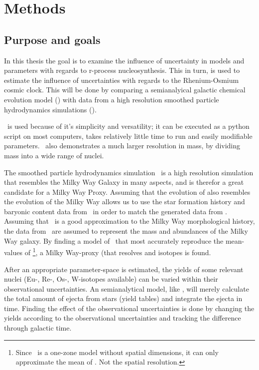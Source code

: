 \chapter{Methods}
\label{sec:methods}
\section{Purpose and goals}
In this thesis the goal is to examine the influence of uncertainty in models and parameters with regards to r-process nucleosynthesis.
This in turn, is used to estimate the influence of uncertainties with regards to the Rhenium-Osmium cosmic clock.
This will be done by comparing a semianalyical galactic chemical evolution model (\omegamodel) with data from a high resolution smoothed particle hydrodynamics simulations (\eris).

\omegamodel\ is used because of it's simplicity and versatility;
it can be executed as a python script on most computers, takes relatively little time to run and easily modifiable parameters.
\omegamodel\ also demonstrates a much larger resolution in mass, by dividing mass into a wide range of nuclei.

The smoothed particle hydrodynamics simulation \eris\ is a high resolution simulation that resembles the Milky Way Galaxy in many aspects, and is therefor a great candidate for a Milky Way Proxy.
Assuming that the evolution of \eris also resembles the evolution of the Milky Way allows us to use the star formation history and baryonic content data from \eris\ in order to match the generated data from \omegamodel.
Assuming that \eris\ is a good approximation to the Milky Way morphological history, the data from \eris\ are assumed to represent the mass and abundances of the Milky Way galaxy.
By finding a model of \omegamodel\ that most accurately reproduce the mean-values of \eris\footnote{Since \omegamodel\ is a one-zone model without spatial dimensions, it can only approximate the mean of \eris. Not the spatial resolution.}, a Milky Way-proxy (that resolves  and  isotopes is found.

After an appropriate parameter-space is estimated, the yields of some relevant nuclei (Eu-, Re-, Os-, W-isotopes available) can be varied within their observational uncertainties.
An semianalytical model, like \omegamodel, will merely calculate the total amount of ejecta from stars (yield tables) and integrate the ejecta in time.
Finding the effect of the observational uncertainties is done by changing the yields according to the observational uncertainties and tracking the difference through galactic time.

